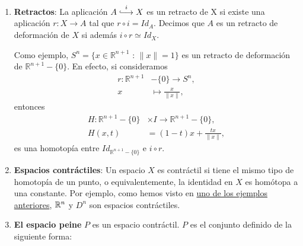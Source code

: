 \begin{ejems}
\begin{enumerate}
\item \label{ej3:ret} \textbf{Retractos}: La aplicación $A \stackrel{i}{\longhookrightarrow} X$
es un retracto de X si existe una aplicación $r : X \longrightarrow A$ tal que $r \circ i = Id_A$.
Decimos que $A$ es un retracto de deformación de $X$ si además $i \circ r \simeq Id_X$.\par
Como ejemplo, $S^n = \{ x \in \mathbb{R}^{n+1}$ : $\| x \| = 1 \}$ es un retracto de deformación de $\mathbb{R}^{n+1} -\{ 0 \}$. En efecto, si consideramos 
\begin{align*}
r : \mathbb{R}^{n+1} &-\{ 0 \} \longrightarrow S^n, \\
x &\longmapsto \frac{x}{\| x \|},
\end{align*}
entonces 
\begin{align*}
H : \mathbb{R}^{n+1} -\{ 0 \} &\times I \longrightarrow \mathbb{R}^{n+1} -\{ 0 \}, \\
H(x, t) &= (1 - t)x + \frac{tx}{\| x \|} ,
\end{align*}
es una homotopía entre $Id_{\mathbb{R}^{n+1} -\{ 0 \}}$ e $i \circ r$.

\item \label{ej3:contr} \textbf{Espacios contráctiles}: Un espacio $X$ es contráctil si tiene el mismo tipo de homotopía de un punto, o equivalentemente, la identidad en $X$ es homótopa a una constante. Por ejemplo, como hemos visto en \hyperlink{ej1:2}{uno de los ejemplos anteriores}, $\mathbb{R}^n$ y $D^n$ son espacios contráctiles.

\item \label{ej3:peine} \textbf{El espacio peine} $P$ es un espacio contráctil. $P$ es el conjunto definido de la siguiente forma: 


\end{enumerate}
\end{ejems}
